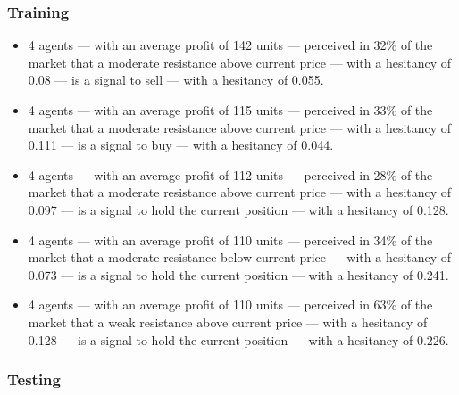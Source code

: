 \subsubsection{Training}

{\small
  \begin{itemize}
  \item 4 agents — with an average profit of 142 units — perceived in 32\% of
    the market that a moderate resistance above current price — with a hesitancy
    of 0.08 — is a signal to sell — with a hesitancy of 0.055.
  \item 4 agents — with an average profit of 115 units — perceived in 33\% of
    the market that a moderate resistance above current price — with a hesitancy
    of 0.111 — is a signal to buy — with a hesitancy of 0.044.
  \item 4 agents — with an average profit of 112 units — perceived in 28\% of
    the market that a moderate resistance above current price — with a hesitancy
    of 0.097 — is a signal to hold the current position — with a hesitancy of
    0.128.
  \item 4 agents — with an average profit of 110 units — perceived in 34\% of
    the market that a moderate resistance below current price — with a hesitancy
    of 0.073 — is a signal to hold the current position — with a hesitancy of
    0.241.
  \item 4 agents — with an average profit of 110 units — perceived in 63\% of
    the market that a weak resistance above current price — with a hesitancy of
    0.128 — is a signal to hold the current position — with a hesitancy of
    0.226.
  \end{itemize}
}

\subsubsection{Testing}

